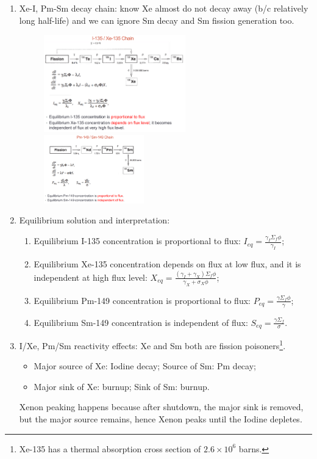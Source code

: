 \documentclass{school-22.211-notes}
\begin{document}
\begin{enumerate}
\item Xe-I, Pm-Sm decay chain: know Xe almost do not decay away (b/c relatively long half-life) and we can ignore Sm decay and Sm fission generation too. 
  \begin{figure}[ht]
    \includegraphics[width=0.58\textwidth]{images/dfs/I-Xe.png}     
    \includegraphics[width=0.41\textwidth]{images/dfs/Pm-Sm.png}     
  \end{figure}



\item Equilibrium solution and interpretation: 
 \begin{enumerate}
   \item Equilibrium I-135 concentration is proportional to flux: $I_{eq} = \frac{\gamma_I \Sigma_f \phi}{\gamma_I}$;
   \item Equilibrium Xe-135 concentration depends on flux at low flux, and it is independent at high flux level: $X_{eq} = \frac{(\gamma_I + \gamma_X) \Sigma_f \phi}{\gamma_X + \sigma_X \phi}$;
   \item Equilibrium Pm-149 concentration is proportional to flux: $P_{eq} = \frac{\gamma \Sigma_f \phi}{\gamma}$;
   \item Equilibrium Sm-149 concentration is independent of flux: $S_{eq} = \frac{\gamma \Sigma_f}{\sigma}$. 
 \end{enumerate}

\item I/Xe, Pm/Sm reactivity effects: Xe and Sm both are fission poisoners\footnote{Xe-135 has a thermal absorption cross section of $2.6\times 10^6$ barns.}. 
\begin{itemize}
\item Major source of Xe: Iodine decay; Source of Sm: Pm decay;
\item Major sink of Xe: burnup; Sink of Sm: burnup. 
\end{itemize}
Xenon peaking happens because after shutdown, the major sink is removed, but the major source remains, hence Xenon peaks until the Iodine depletes. 


\end{enumerate}
\end{document}

